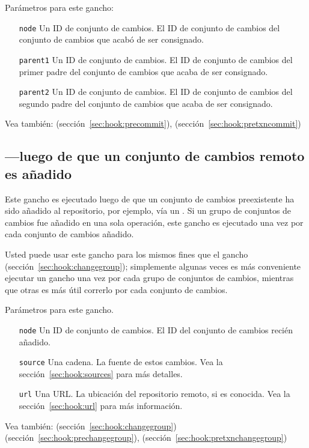 Parámetros para este gancho:
\begin{itemize}
\item[\texttt{node}] Un ID de conjunto de cambios. El ID de conjunto
  de cambios del conjunto de cambios que acabó de ser consignado.
\item[\texttt{parent1}] Un ID de conjunto de cambios. El ID de
  conjunto de cambios del primer padre del conjunto de cambios que
  acaba de ser consignado.
\item[\texttt{parent2}] Un ID de conjunto de cambios. El ID de
  conjunto de cambios del segundo padre del conjunto de cambios que
  acaba de ser consignado.
\end{itemize}

Vea también:  (sección~\ref{sec:hook:precommit}),
 (sección~\ref{sec:hook:pretxncommit})

\subsection{---luego de que un conjunto de cambios
remoto es añadido}
\label{sec:hook:incoming}

Este gancho es ejecutado luego de que un conjunto de cambios
preexistente ha sido añadido al repositorio, por ejemplo, vía un
.  Si un grupo de conjuntos de cambios fue añadido en una
sola operación, este gancho es ejecutado una vez por cada conjunto de
cambios añadido.

Usted puede usar este gancho para los mismos fines que el gancho
 (sección~\ref{sec:hook:changegroup}); simplemente
algunas veces es más conveniente ejecutar un gancho una vez por cada
grupo de conjuntos de cambios, mientras que otras es más útil correrlo
por cada conjunto de cambios.

Parámetros para este gancho.
\begin{itemize}
\item[\texttt{node}] Un ID de conjunto de cambios. El ID del conjunto
  de cambios recién añadido.
\item[\texttt{source}] Una cadena. La fuente de estos cambios. Vea la
  sección~\ref{sec:hook:sources} para más detalles.
\item[\texttt{url}] Una URL. La ubicación del repositorio remoto, si
  es conocida. Vea la sección~\ref{sec:hook:url} para más información.
\end{itemize}

Vea también:  (sección~\ref{sec:hook:changegroup})
 (sección~\ref{sec:hook:prechangegroup}),
 (sección~\ref{sec:hook:pretxnchangegroup})

